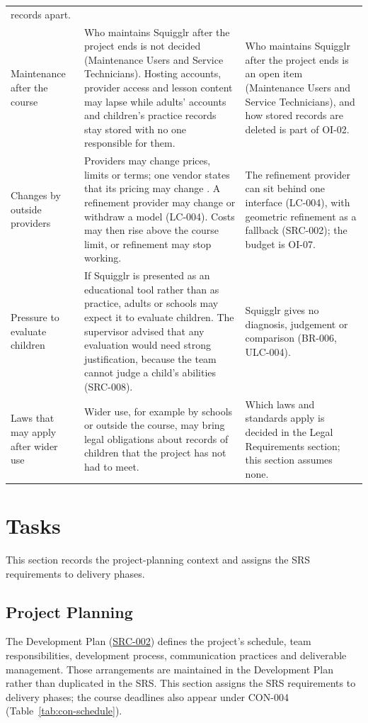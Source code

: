 \documentclass[12pt]{article}
\renewcommand{\_}{\textunderscore\allowbreak}%
\newcommand{\srcref}[1]{\hyperref[src:#1]{SRC-#1}}
\begin{document}
{\begin{longtable}{@{}>{\raggedright\arraybackslash}p{}%
>{\raggedright\arraybackslash}p{}%
>{\raggedright\arraybackslash}p{}@{}}
records apart. \\
\addlinespace
Maintenance after the course & Who maintains Squigglr after the project ends is
not decided (Maintenance Users and Service Technicians). Hosting accounts,
provider access and lesson content may lapse while adults' accounts and
children's practice records stay stored with no one responsible for them. & Who
maintains Squigglr after the project ends is an open item (Maintenance Users and
Service Technicians), and how stored records are deleted is part of OI-02. \\
\addlinespace
Changes by outside providers & Providers may change prices, limits or terms; one
vendor states that its pricing may change \citep{Supabase2026Pricing}. A
refinement provider may change or withdraw a model (LC-004). Costs may then rise
above the course limit, or refinement may stop working. & The refinement
provider can sit behind one interface (LC-004), with geometric refinement as a
fallback (SRC-002); the budget is OI-07. \\
\addlinespace
Pressure to evaluate children & If Squigglr is presented as an educational tool
rather than as practice, adults or schools may expect it to evaluate children.
The supervisor advised that any evaluation would need strong justification,
because the team cannot judge a child's abilities (SRC-008). & Squigglr gives no
diagnosis, judgement or comparison (BR-006, ULC-004). \\
\addlinespace
Laws that may apply after wider use & Wider use, for example by schools or
outside the course, may bring legal obligations about records of children that
the project has not had to meet. & Which laws and standards apply is decided in
the Legal Requirements section; this section assumes none. \\
\end{longtable}
}

\section{Tasks}
\label{sec:tasks}
This section records the project-planning context and assigns the SRS
requirements to delivery phases.

\subsection{Project Planning}

The Development Plan (\srcref{002}) defines the project's schedule, team
responsibilities, development process, communication practices and deliverable
management. Those arrangements are maintained in the Development Plan rather
than duplicated in the SRS. This section assigns the SRS requirements to
delivery phases; the course deadlines also appear under CON-004
(Table~\ref{tab:con-schedule}).
\end{document}
